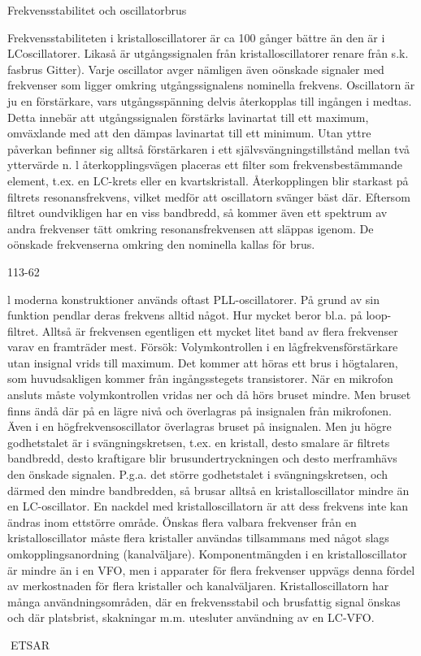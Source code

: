 Frekvensstabilitet och oscillatorbrus

Frekvensstabiliteten i kristalloscillatorer är
ca 100 gånger bättre än den är i LCoscillatorer. Likaså är utgångssignalen från
kristalloscillatorer renare från s.k. fasbrus
Gitter). Varje oscillator avger nämligen även
oönskade signaler med frekvenser som ligger omkring utgångssignalens nominella
frekvens.
Oscillatorn är ju en förstärkare, vars utgångsspänning delvis återkopplas till ingången i medtas. Detta innebär att utgångssignalen förstärks lavinartat till ett maximum, omväxlande med att den dämpas lavinartat till
ett minimum. Utan yttre påverkan befinner
sig alltså förstärkaren i ett självsvängningstillstånd mellan två yttervärde n. l återkopplingsvägen placeras ett filter som frekvensbestämmande element, t.ex. en LC-krets
eller en kvartskristall.
Återkopplingen blir starkast på filtrets
resonansfrekvens, vilket medför att oscillatorn svänger bäst där. Eftersom filtret oundvikligen har en viss bandbredd, så kommer
även ett spektrum av andra frekvenser tätt
omkring resonansfrekvensen att släppas
igenom. De oönskade frekvenserna omkring
den nominella kallas för brus.

113-62

l moderna konstruktioner används oftast
PLL-oscillatorer. På grund av sin funktion
pendlar deras frekvens alltid något. Hur
mycket beror bl.a. på loop-filtret. Alltså är
frekvensen egentligen ett mycket litet band
av flera frekvenser varav en framträder mest.
Försök:
Volymkontrollen i en lågfrekvensförstärkare
utan insignal vrids till maximum. Det kommer att höras ett brus i högtalaren, som
huvudsakligen kommer från ingångsstegets
transistorer. När en mikrofon ansluts måste
volymkontrollen vridas ner och då hörs bruset
mindre. Men bruset finns ändå där på en
lägre nivå och överlagras på insignalen från
mikrofonen.
Även i en högfrekvensoscillator överlagras bruset på insignalen. Men ju högre godhetstalet är i svängningskretsen, t.ex. en
kristall, desto smalare är filtrets bandbredd,
desto kraftigare blir brusundertryckningen
och desto merframhävs den önskade signalen. P.g.a. det större godhetstalet i svängningskretsen, och därmed den mindre bandbredden, så brusar alltså en kristalloscillator
mindre än en LC-oscillator.
En nackdel med kristalloscillatorn är att
dess frekvens inte kan ändras inom ettstörre
område. Önskas flera valbara frekvenser
från en kristalloscillator måste flera kristaller
användas tillsammans med något slags
omkopplingsanordning (kanalväljare).
Komponentmängden i en kristalloscillator
är mindre än i en VFO, men i apparater för
flera frekvenser uppvägs denna fördel av
merkostnaden för flera kristaller och kanalväljaren.
Kristalloscillatorn har många användningsområden, där en frekvensstabil och
brusfattig signal önskas och där platsbrist,
skakningar m.m. utesluter användning av en
LC-VFO.

ETSAR
